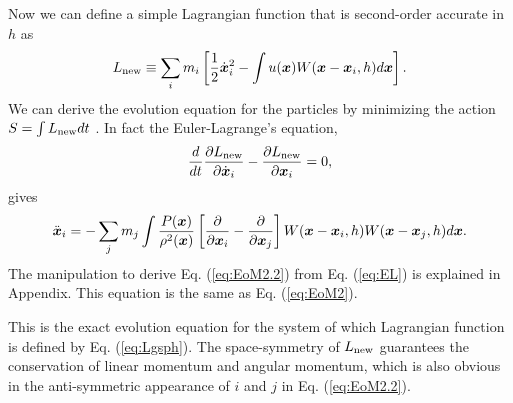 \documentclass{cjour}
\newcommand{ \Vec   }[1]{ \mbox{\boldmath $ #1 $} }
\newcommand{ \PD    }[2]{ \frac{ \partial #1 }{ \partial #2 } }
\begin{document}
\begin{article}
 
Now we can define a simple Lagrangian function 
that is second-order accurate in $h$ as    
\begin{equation}
                L_{\rm new} \equiv \sum_i m_i \left[ 
                          \frac{1}{2} \dot{\Vec{x}}_i ^2 - 
                     \int u(\Vec{x}) W(\Vec{x}-\Vec{x}_i, h) d\Vec{x}
                                     \right] . 
                                                  \label{eq:Lgsph}
\end{equation}
We can derive the evolution equation for the particles by minimizing 
the action $ S = \int L_{\rm new}dt $ . 
In fact the Euler-Lagrange's equation, 
 \begin{equation}
                \frac{d}{dt} \PD{L_{\rm new}}{\dot{\Vec{x}}_i} 
                           - \PD{L_{\rm new}}{     \Vec{x}_i } = 0 ,
                                                        \label{eq:EL}
 \end{equation}
%
 gives 
%
\begin{equation}
                \ddot{\Vec{x}}_i  = 
              - \sum_{j} m_j 
                         \int \frac{ P(\Vec{x}) }{ \rho^2(\Vec{x}) }
                         \left[  \PD{}{\Vec{x}_i} 
                               - \PD{}{\Vec{x}_j}  \right]
                         W(\Vec{x}-\Vec{x}_i, h)
                         W(\Vec{x}-\Vec{x}_j, h) d\Vec{x} .
                                                       \label{eq:EoM2.2}
\end{equation}
The manipulation to derive Eq. (\ref{eq:EoM2.2}) from 
Eq. (\ref{eq:EL}) is explained in Appendix. 
This equation is the same as Eq. (\ref{eq:EoM2}).  

This is the exact evolution equation for the system of which Lagrangian 
function is defined by Eq. (\ref{eq:Lgsph}). 
The space-symmetry of $L_{\rm new}$ guarantees 
the conservation of linear momentum and angular momentum, 
which is also obvious in the anti-symmetric appearance of 
$i$ and $j$ in Eq. (\ref{eq:EoM2.2}). 


\end{article}
\end{document}
